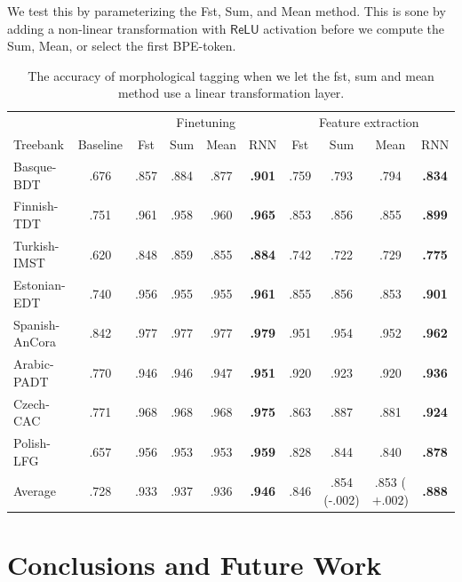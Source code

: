 \documentclass[11pt]{article}
\begin{document}
            We test this by parameterizing the Fst, Sum, and Mean
     method. This is sone by adding a non-linear transformation with
     $\mathsf{ReLU}$ activation before we compute the Sum, Mean, or
     select the first BPE-token.


        \begin{table}%
	\centering
	\begin{tabular}{l|c|cccc|cccc}
		& & \multicolumn{4}{c}{Finetuning} & \multicolumn{4}{c}{Feature extraction} \\
		Treebank & Baseline & Fst & Sum & Mean & RNN & Fst & Sum & Mean & RNN \\
		\hline
		Basque-BDT      & .676 & .857 & .884 & .877 & \textbf{.901} & .759 & .793 & .794 & \textbf{.834} \\
		Finnish-TDT     & .751 & .961 & .958 & .960 & \textbf{.965} & .853 & .856 & .855 & \textbf{.899} \\
		Turkish-IMST    & .620 & .848 & .859 & .855 & \textbf{.884} & .742 & .722 & .729 & \textbf{.775} \\
		Estonian-EDT    & .740 & .956 & .955 & .955 & \textbf{.961} & .855 & .856 & .853 & \textbf{.901} \\
		Spanish-AnCora  & .842 & .977 & .977 & .977 & \textbf{.979} & .951 & .954 & .952 & \textbf{.962} \\
		Arabic-PADT     & .770 & .946 & .946 & .947 & \textbf{.951} & .920 & .923 & .920 & \textbf{.936} \\
		Czech-CAC       & .771 & .968 & .968 & .968 & \textbf{.975} & .863 & .887 & .881 & \textbf{.924} \\
		Polish-LFG      & .657 & .956 & .953 & .953 & \textbf{.959} & .828 & .844 & .840 & \textbf{.878} \\
        \hline
        Average         & .728 & .933 & .937 & .936 & \textbf{.946} & .846 & .854 (-.002) & .853 ($+.002$) & \textbf{.888} \\
	\end{tabular}
    	\caption{\label{tab:parameters} The accuracy of morphological tagging when we let the fst, sum and mean method use a linear transformation layer.}
    
    \end{table}

    \section{Conclusions and Future Work}


    
\end{document}
